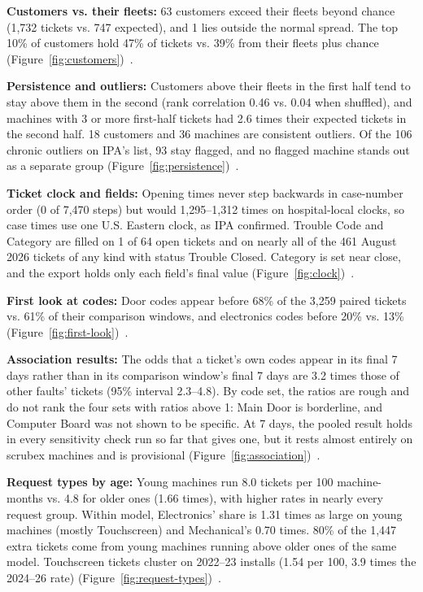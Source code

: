 \smallskip\noindent\textbf{Customers vs. their fleets:}
63 customers exceed their fleets beyond chance (1,732 tickets vs. 747 expected), and 1 lies outside the normal spread. The top 10\% of customers hold 47\% of tickets vs. 39\% from their fleets plus chance (Figure~\ref{fig:customers})~\cite{nb04}.

\smallskip\noindent\textbf{Persistence and outliers:}
Customers above their fleets in the first half tend to stay above them in the second (rank correlation 0.46 vs. 0.04 when shuffled), and machines with 3 or more first-half tickets had 2.6 times their expected tickets in the second half. 18 customers and 36 machines are consistent outliers. Of the 106 chronic outliers on IPA's list, 93 stay flagged, and no flagged machine stands out as a separate group (Figure~\ref{fig:persistence})~\cite{nb04}.

\smallskip\noindent\textbf{Ticket clock and fields:}
Opening times never step backwards in case-number order (0 of 7,470 steps) but would 1,295--1,312 times on hospital-local clocks, so case times use one U.S. Eastern clock, as IPA confirmed. Trouble Code and Category are filled on 1 of 64 open tickets and on nearly all of the 461 August 2026 tickets of any kind with status Trouble Closed. Category is set near close, and the export holds only each field's final value (Figure~\ref{fig:clock})~\cite{nb05}.

\smallskip\noindent\textbf{First look at codes:}
Door codes appear before 68\% of the 3,259 paired tickets vs. 61\% of their comparison windows, and electronics codes before 20\% vs. 13\% (Figure~\ref{fig:first-look})~\cite{nb06}.

\smallskip\noindent\textbf{Association results:}
The odds that a ticket's own codes appear in its final 7 days rather than in its comparison window's final 7 days are 3.2 times those of other faults' tickets (95\% interval 2.3--4.8). By code set, the ratios are rough and do not rank the four sets with ratios above 1: Main Door is borderline, and Computer Board was not shown to be specific. At 7 days, the pooled result holds in every sensitivity check run so far that gives one, but it rests almost entirely on scrubex machines and is provisional (Figure~\ref{fig:association})~\cite{nb06}.

\smallskip\noindent\textbf{Request types by age:}
Young machines run 8.0 tickets per 100 machine-months vs. 4.8 for older ones (1.66 times), with higher rates in nearly every request group. Within model, Electronics' share is 1.31 times as large on young machines (mostly Touchscreen) and Mechanical's 0.70 times. 80\% of the 1,447 extra tickets come from young machines running above older ones of the same model. Touchscreen tickets cluster on 2022--23 installs (1.54 per 100, 3.9 times the 2024--26 rate) (Figure~\ref{fig:request-types})~\cite{nb07}.

